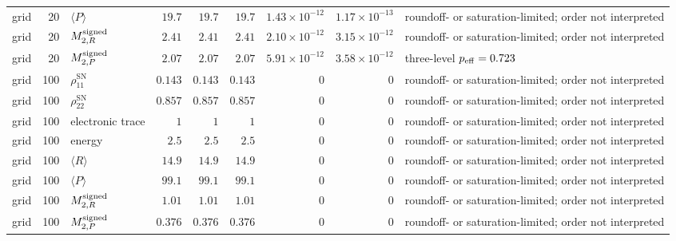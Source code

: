 \begin{landscape}
\begin{longtable}{l r l r r r r r L{0.18\textwidth}}
grid & 20 & $\langle P\rangle$ & $19.7$ & $19.7$ & $19.7$ & $1.43\times10^{-12}$ & $1.17\times10^{-13}$ & roundoff- or saturation-limited; order not interpreted \\
grid & 20 & $M^{\rm signed}_{2,R}$ & $2.41$ & $2.41$ & $2.41$ & $2.10\times10^{-12}$ & $3.15\times10^{-12}$ & roundoff- or saturation-limited; order not interpreted \\
grid & 20 & $M^{\rm signed}_{2,P}$ & $2.07$ & $2.07$ & $2.07$ & $5.91\times10^{-12}$ & $3.58\times10^{-12}$ & three-level $p_{\rm eff}=0.723$ \\
grid & 100 & $\rho_{11}^{\mathrm{SN}}$ & $0.143$ & $0.143$ & $0.143$ & $0$ & $0$ & roundoff- or saturation-limited; order not interpreted \\
grid & 100 & $\rho_{22}^{\mathrm{SN}}$ & $0.857$ & $0.857$ & $0.857$ & $0$ & $0$ & roundoff- or saturation-limited; order not interpreted \\
grid & 100 & electronic trace & $1$ & $1$ & $1$ & $0$ & $0$ & roundoff- or saturation-limited; order not interpreted \\
grid & 100 & energy & $2.5$ & $2.5$ & $2.5$ & $0$ & $0$ & roundoff- or saturation-limited; order not interpreted \\
grid & 100 & $\langle R\rangle$ & $14.9$ & $14.9$ & $14.9$ & $0$ & $0$ & roundoff- or saturation-limited; order not interpreted \\
grid & 100 & $\langle P\rangle$ & $99.1$ & $99.1$ & $99.1$ & $0$ & $0$ & roundoff- or saturation-limited; order not interpreted \\
grid & 100 & $M^{\rm signed}_{2,R}$ & $1.01$ & $1.01$ & $1.01$ & $0$ & $0$ & roundoff- or saturation-limited; order not interpreted \\
grid & 100 & $M^{\rm signed}_{2,P}$ & $0.376$ & $0.376$ & $0.376$ & $0$ & $0$ & roundoff- or saturation-limited; order not interpreted \\
\end{longtable}
\endgroup
\end{landscape}

